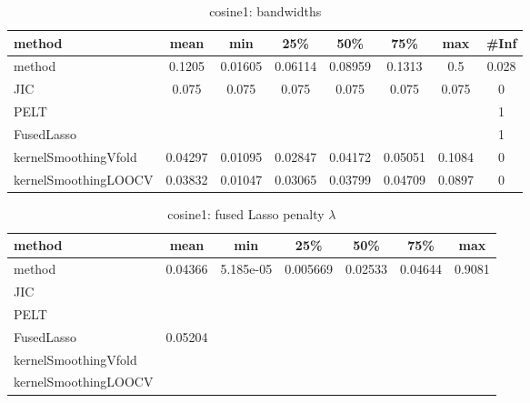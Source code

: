 \begin{table}[ht]
\centering
\begin{tabular}{l|c|ccccc|c}
  \hline
method & mean & min & 25\% & 50\% & 75\% & max & \#Inf \\ 
  \hline
method & 0.1205 & 0.01605 & 0.06114 & 0.08959 & 0.1313 &   0.5 & 0.028 \\ 
  JIC & 0.075 & 0.075 & 0.075 & 0.075 & 0.075 & 0.075 &   0 \\ 
  PELT &  &  &  &  &  &  &   1 \\ 
  FusedLasso &  &  &  &  &  &  &   1 \\ 
  kernelSmoothingVfold & 0.04297 & 0.01095 & 0.02847 & 0.04172 & 0.05051 & 0.1084 &   0 \\ 
  kernelSmoothingLOOCV & 0.03832 & 0.01047 & 0.03065 & 0.03799 & 0.04709 & 0.0897 &   0 \\ 
   \hline
\end{tabular}
\caption{cosine1: bandwidths} 
\label{tab:cosine1Bandwidths}
\end{table}
\begin{table}[ht]
\centering
\begin{tabular}{l|c|ccccc}
  \hline
method & mean & min & 25\% & 50\% & 75\% & max \\ 
  \hline
method & 0.04366 & 5.185e-05 & 0.005669 & 0.02533 & 0.04644 & 0.9081 \\ 
  JIC &  &  &  &  &  &  \\ 
  PELT &  &  &  &  &  &  \\ 
  FusedLasso & 0.05204 &  &  &  &  &  \\ 
  kernelSmoothingVfold &  &  &  &  &  &  \\ 
  kernelSmoothingLOOCV &  &  &  &  &  &  \\ 
   \hline
\end{tabular}
\caption{cosine1: fused Lasso penalty $\lambda$} 
\label{tab:cosine1Lambdas}
\end{table}
